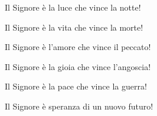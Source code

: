 
\strofa Il Signore è la luce che vince la notte!

\spazio

 

\spazio

\strofa Il Signore è la vita che vince la morte!

\spazio

 

\spazio

\strofa Il Signore è l'amore che vince il peccato!

\spazio

 

\spazio

\strofa Il Signore è la gioia che vince l'angoscia!

\spazio

 

\spazio

\strofa Il Signore è la pace che  vince la guerra!

\spazio

 

\spazio

\strofa Il Signore è speranza di un nuovo futuro!

\spazio

 